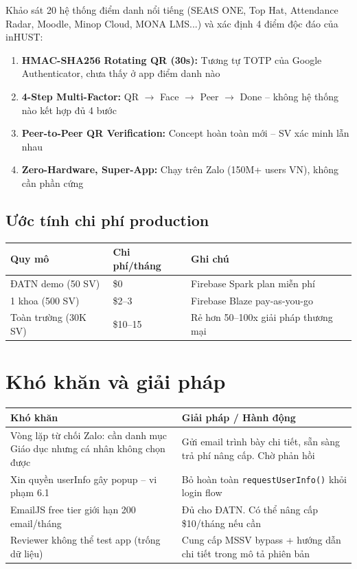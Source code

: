\documentclass{article}
\begin{document}
Khảo sát 20 hệ thống điểm danh nổi tiếng (SEAtS ONE, Top Hat, Attendance Radar, Moodle, Minop Cloud, MONA LMS...) và xác định 4 điểm độc đáo của inHUST:

\begin{enumerate}[leftmargin=1.5em]
  \item \textbf{HMAC-SHA256 Rotating QR (30s):} Tương tự TOTP của Google Authenticator, chưa thấy ở app điểm danh nào
  \item \textbf{4-Step Multi-Factor:} QR $\rightarrow$ Face $\rightarrow$ Peer $\rightarrow$ Done -- không hệ thống nào kết hợp đủ 4 bước
  \item \textbf{Peer-to-Peer QR Verification:} Concept hoàn toàn mới -- SV xác minh lẫn nhau
  \item \textbf{Zero-Hardware, Super-App:} Chạy trên Zalo (150M+ users VN), không cần phần cứng
\end{enumerate}

\subsection{Ước tính chi phí production}

\begin{tabularx}{\textwidth}{@{}l l X@{}}
\toprule
\textbf{Quy mô} & \textbf{Chi phí/tháng} & \textbf{Ghi chú} \\
\midrule
ĐATN demo (50 SV) & \$0 & Firebase Spark plan miễn phí \\
1 khoa (500 SV) & \$2--3 & Firebase Blaze pay-as-you-go \\
Toàn trường (30K SV) & \$10--15 & Rẻ hơn 50--100x giải pháp thương mại \\
\bottomrule
\end{tabularx}

\section{Khó khăn và giải pháp}

\begin{tabularx}{\textwidth}{@{}X X@{}}
\toprule
\textbf{Khó khăn} & \textbf{Giải pháp / Hành động} \\
\midrule
Vòng lặp từ chối Zalo: cần danh mục Giáo dục nhưng cá nhân không chọn được & Gửi email trình bày chi tiết, sẵn sàng trả phí nâng cấp. Chờ phản hồi \\
\addlinespace
Xin quyền userInfo gây popup -- vi phạm 6.1 & Bỏ hoàn toàn \texttt{requestUserInfo()} khỏi login flow \\
\addlinespace
EmailJS free tier giới hạn 200 email/tháng & Đủ cho ĐATN. Có thể nâng cấp \$10/tháng nếu cần \\
\addlinespace
Reviewer không thể test app (trống dữ liệu) & Cung cấp MSSV bypass + hướng dẫn chi tiết trong mô tả phiên bản \\
\bottomrule
\end{tabularx}
\end{document}
